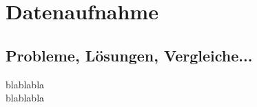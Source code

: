 
\chapter{Datenaufnahme} %
\label{cha:Datenaufnahme}

\section{Probleme, Lösungen, Vergleiche...} %
\label{sec:Probleme_Loesungen_Vergleiche}
blablabla\\

blablabla


